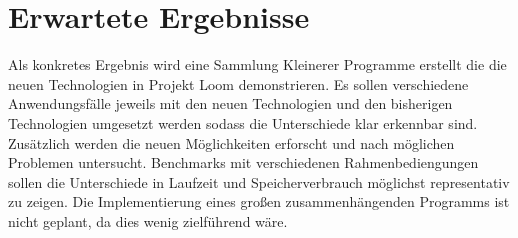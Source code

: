 \section{Erwartete Ergebnisse}



Als konkretes Ergebnis wird eine Sammlung Kleinerer Programme erstellt die die neuen Technologien in Projekt Loom demonstrieren.
Es sollen verschiedene Anwendungsfälle jeweils mit den neuen Technologien und den bisherigen Technologien umgesetzt werden sodass die Unterschiede klar erkennbar sind.
Zusätzlich werden die neuen Möglichkeiten erforscht und nach möglichen Problemen untersucht.
Benchmarks mit verschiedenen Rahmenbediengungen sollen die Unterschiede in Laufzeit und Speicherverbrauch möglichst representativ zu zeigen.
Die Implementierung eines großen zusammenhängenden Programms ist nicht geplant, da dies wenig zielführend wäre.
